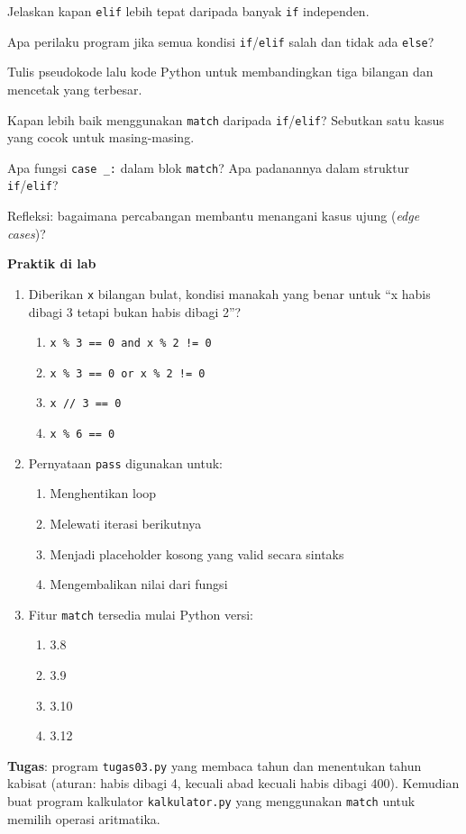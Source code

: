 ﻿\documentclass[../main.tex]{subfiles}
\begin{document}
\begin{latihan}
  \item Jelaskan kapan \texttt{elif} lebih tepat daripada banyak \texttt{if} independen.
  \item Apa perilaku program jika semua kondisi \texttt{if}/\texttt{elif} salah dan tidak ada \texttt{else}?
  \item Tulis pseudokode lalu kode Python untuk membandingkan tiga bilangan dan mencetak yang terbesar.
  \item Kapan lebih baik menggunakan \texttt{match} daripada \texttt{if}/\texttt{elif}? Sebutkan satu kasus yang cocok untuk masing-masing.
  \item Apa fungsi \texttt{case \_:} dalam blok \texttt{match}? Apa padanannya dalam struktur \texttt{if}/\texttt{elif}?
  \item Refleksi: bagaimana percabangan membantu menangani kasus ujung (\textit{edge cases})?
\end{latihan}

\begin{asesmen}
\textbf{Praktik di lab}

\begin{enumerate}
  \item Diberikan \texttt{x} bilangan bulat, kondisi manakah yang benar untuk ``x habis dibagi 3 tetapi bukan habis dibagi 2''?
  \begin{enumerate}
    \item \texttt{x \% 3 == 0 and x \% 2 != 0}
    \item \texttt{x \% 3 == 0 or x \% 2 != 0}
    \item \texttt{x // 3 == 0}
    \item \texttt{x \% 6 == 0}
  \end{enumerate}
  \item Pernyataan \texttt{pass} digunakan untuk:
  \begin{enumerate}
    \item Menghentikan loop
    \item Melewati iterasi berikutnya
    \item Menjadi placeholder kosong yang valid secara sintaks
    \item Mengembalikan nilai dari fungsi
  \end{enumerate}
  \item Fitur \texttt{match} tersedia mulai Python versi:
  \begin{enumerate}
    \item 3.8
    \item 3.9
    \item 3.10
    \item 3.12
  \end{enumerate}
\end{enumerate}

\textbf{Tugas}: program \texttt{tugas03.py} yang membaca tahun dan menentukan tahun kabisat (aturan: habis dibagi 4, kecuali abad kecuali habis dibagi 400). Kemudian buat program kalkulator \texttt{kalkulator.py} yang menggunakan \texttt{match} untuk memilih operasi aritmatika.
\end{asesmen}
\end{document}
